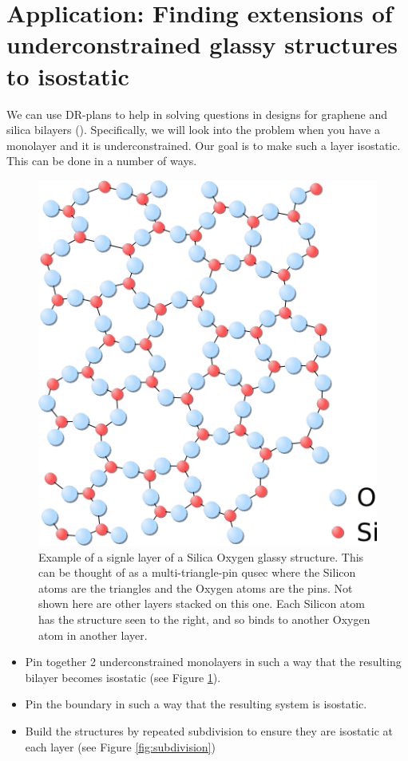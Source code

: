 \section{Application: Finding extensions of underconstrained glassy structures to isostatic}
\label{sec:bodypin}

We can use DR-plans to help in solving questions in designs for graphene and silica bilayers (). Specifically, we will look into the problem when you have a monolayer and it is underconstrained. Our goal is to make such a layer isostatic. This can be done in a number of ways.

\begin{figure}\centering
    \includegraphics[width=0.4\linewidth]{img/Silica} \hspace{0.5cm}
    \caption{Example of a signle layer of a Silica Oxygen glassy structure. This can be thought of as a multi-triangle-pin qusec where the Silicon atoms are the triangles and the Oxygen atoms are the pins. Not shown here are other layers stacked on this one. Each Silicon atom has the structure seen to the right, and so binds to another Oxygen atom in another layer.}
    \label{fig:silica_glass}
\end{figure}

\begin{itemize}
    \item Pin together 2 underconstrained monolayers in such a way that the resulting bilayer becomes isostatic (see Figure \ref{fig:silica_glass}).
    \item Pin the boundary in such a way that the resulting system is isostatic.
    \item Build the structures by repeated subdivision to ensure they are isostatic at each layer (see Figure \ref{fig:subdivision})
\end{itemize}

